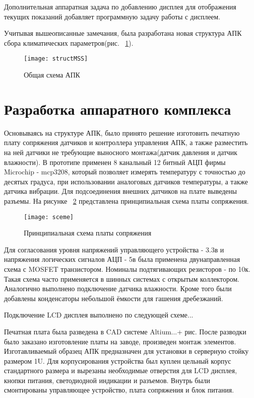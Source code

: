 Дополнительная аппаратная задача по добавлению дисплея для отображения текущих показаний добавляет программную задачу работы с дисплеем. 

Учитывая вышеописанные замечания, была разработана новая структура АПК сбора климатических параметров(рис. ~\ref{fig:structMSS}).
\begin{figure}[h]
	\centering
	\texttt{[image: structMSS]}
	\caption{Общая схема АПК}
	\label{fig:structMSS}
\end{figure}

\section{Разработка аппаратного комплекса}
Основываясь на структуре АПК, было принято решение изготовить печатную плату сопряжения датчиков и контроллера управления АПК, а также разместить на ней датчики не требующие выносного монтажа(датчик давления и датчик влажности).  
В прототипе применен 8 канальный 12 битный АЦП фирмы Microchip - mcp3208, который позволяет измерять температуру с точностью до десятых градуса, при использовании аналоговых датчиков температуры, а также датчика вибрации. Для подсоединения внешних датчиков на плате выведены разъемы.
На рисунке  ~\ref{fig:sceme} представлена принципиальная схема платы сопряжения. 
\begin{figure}[H]
	\centering
	\texttt{[image: sceme]}
	\caption{Принципиальная схема платы сопряжения}
	\label{fig:sceme}
\end{figure}

Для согласования уровня напряжений управляющего устройства - 3.3в и напряжения логических сигналов АЦП - 5в была применена двунаправленная схема с MOSFET транзистором. Номиналы подтягивающих резисторов - по 10к. Такая схема часто применяется в шинных системах с открытым коллектором.  Аналогично выполнено подключение датчика влажности. Кроме того были добавлены конденсаторы небольшой ёмкости для гашения дребезжаний. 

Подключение LCD дисплея выполнено по следующей схеме... 

Печатная плата была разведена в CAD системе Altium...+ рис.
После разводки было заказано изготовление платы на заводе, произведен монтаж элементов.  
Изготавливаемый образец АПК предназначен для установки в серверную стойку размером 1U. Для корпусирования устройства был куплен цельный корпус стандартного размера и вырезаны необходимые отверстия для LCD дисплея, кнопки питания, светодиодной индикации и разъемов. Внутрь были смонтированы управляющее устройство, плата сопряжения и блок питания. 

